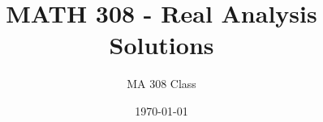 \documentclass[openany]{amsart}
\theoremstyle{definition}
\begin{document}
\title{MATH 308 - Real Analysis Solutions}
\author{MA 308 Class}
\date{\today}
\maketitle
\end{document}

